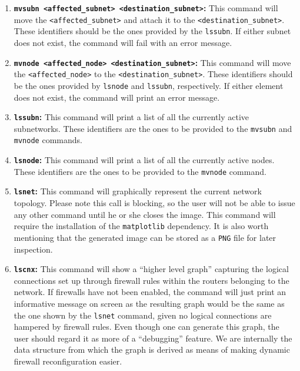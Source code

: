                 \begin{enumerate}
                    \item \textbf{\texttt{mvsubn <affected\_subnet> <destination\_subnet>}:} This command will move the \texttt{<affected\_subnet>} and attach it to the \texttt{\allowbreak<destination\_subnet>}. These identifiers should be the ones provided by the \texttt{lssubn}. If either subnet does not exist, the command will fail with an error message.
                    \item \textbf{\texttt{mvnode <affected\_node> <destination\_subnet>}:} This command will move the \texttt{<affected\_node>} to the \texttt{<destination\_subnet>}. These identifiers should be the ones provided by \texttt{lsnode} and \texttt{lssubn}, respectively. If either element does not exist, the command will print an error message.
                    \item \textbf{\texttt{lssubn}:} This command will print a list of all the currently active subnetworks. These identifiers are the ones to be provided to the \texttt{mvsubn} and \texttt{mvnode} commands.
                    \item \textbf{\texttt{lsnode}:} This command will print a list of all the currently active nodes. These identifiers are the ones to be provided to the \texttt{mvnode} command.
                    \item \textbf{\texttt{lsnet}:} This command will graphically represent the current network topology. Please note this call is blocking, so the user will not be able to issue any other command until he or she closes the image. This command will require the installation of the \texttt{matplotlib} dependency. It is also worth mentioning that the generated image can be stored as a \texttt{PNG} file for later inspection.
                    \item \textbf{\texttt{lscnx}:} This command will show a ``higher level graph'' capturing the logical connections set up through firewall rules within the routers belonging to the network. If firewalls have not been enabled, the command will just print an informative message on screen as the resulting graph would be the same as the one shown by the \texttt{lsnet} command, given no logical connections are hampered by firewall rules. Even though one can generate this graph, the user should regard it as more of a ``debugging'' feature. We are internally the data structure from which the graph is derived as means of making dynamic firewall reconfiguration easier.

\end{enumerate}
